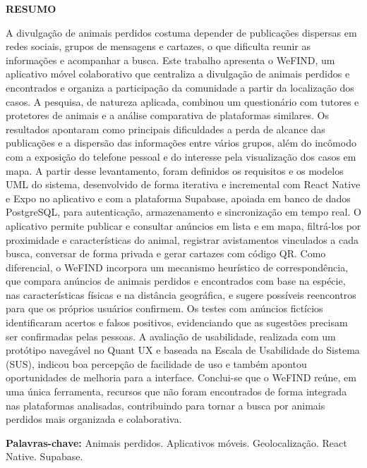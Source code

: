 \thispagestyle{empty}

\begin{center}
    \textbf{\large RESUMO}
\end{center}

\vspace{14pt}

\begin{singlespace}
\noindent\justifying
A divulgação de animais perdidos costuma depender de publicações dispersas em redes sociais, grupos de mensagens e cartazes, o que dificulta reunir as informações e acompanhar a busca. Este trabalho apresenta o WeFIND, um aplicativo móvel colaborativo que centraliza a divulgação de animais perdidos e encontrados e organiza a participação da comunidade a partir da localização dos casos. A pesquisa, de natureza aplicada, combinou um questionário com tutores e protetores de animais e a análise comparativa de plataformas similares. Os resultados apontaram como principais dificuldades a perda de alcance das publicações e a dispersão das informações entre vários grupos, além do incômodo com a exposição do telefone pessoal e do interesse pela visualização dos casos em mapa. A partir desse levantamento, foram definidos os requisitos e os modelos UML do sistema, desenvolvido de forma iterativa e incremental com React Native e Expo no aplicativo e com a plataforma Supabase, apoiada em banco de dados PostgreSQL, para autenticação, armazenamento e sincronização em tempo real. O aplicativo permite publicar e consultar anúncios em lista e em mapa, filtrá-los por proximidade e características do animal, registrar avistamentos vinculados a cada busca, conversar de forma privada e gerar cartazes com código QR. Como diferencial, o WeFIND incorpora um mecanismo heurístico de correspondência, que compara anúncios de animais perdidos e encontrados com base na espécie, nas características físicas e na distância geográfica, e sugere possíveis reencontros para que os próprios usuários confirmem. Os testes com anúncios fictícios identificaram acertos e falsos positivos, evidenciando que as sugestões precisam ser confirmadas pelas pessoas. A avaliação de usabilidade, realizada com um protótipo navegável no Quant UX e baseada na Escala de Usabilidade do Sistema (SUS), indicou boa percepção de facilidade de uso e também apontou oportunidades de melhoria para a interface. Conclui-se que o WeFIND reúne, em uma única ferramenta, recursos que não foram encontrados de forma integrada nas plataformas analisadas, contribuindo para tornar a busca por animais perdidos mais organizada e colaborativa.

\vspace{18pt}

\noindent
\textbf{Palavras-chave:} Animais perdidos. Aplicativos móveis. Geolocalização. React Native. Supabase.
\end{singlespace}

\clearpage
